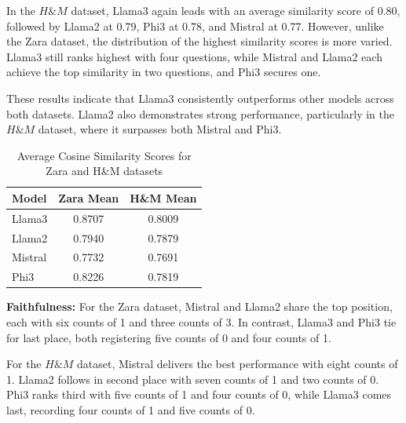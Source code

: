 \documentclass[]{article}
\begin{document}
In the $H\&M$ dataset, Llama3 again leads with an average similarity score of 0.80, followed by Llama2 at 0.79, Phi3 at 0.78, and Mistral at 0.77. However, unlike the Zara dataset, the distribution of the highest similarity scores is more varied. Llama3 still ranks highest with four questions, while Mistral and Llama2 each achieve the top similarity in two questions, and Phi3 secures one.

These results indicate that Llama3 consistently outperforms other models across both datasets. Llama2 also demonstrates strong performance, particularly in the $H\&M$ dataset, where it surpasses both Mistral and Phi3.

\begin{table}[H]
    \centering
    \begin{tabular}{lcc}
        \toprule
        \textbf{Model} & \textbf{Zara Mean} & \textbf{H\&M Mean} \\
        \midrule
        Llama3  & 0.8707 & 0.8009 \\
        Llama2  & 0.7940 & 0.7879 \\
        Mistral & 0.7732 & 0.7691 \\
        Phi3    & 0.8226 & 0.7819 \\
        \bottomrule
    \end{tabular}
    \caption{Average Cosine Similarity Scores for Zara and H\&M datasets}
    \label{tab:cosine_similarity}
\end{table}

\textbf{Faithfulness:}
For the Zara dataset, Mistral and Llama2 share the top position, each with six counts of 1 and three counts of 3. In contrast, Llama3 and Phi3 tie for last place, both registering five counts of 0 and four counts of 1.  

For the $H\&M$ dataset, Mistral delivers the best performance with eight counts of 1. Llama2 follows in second place with seven counts of 1 and two counts of 0. Phi3 ranks third with five counts of 1 and four counts of 0, while Llama3 comes last, recording four counts of 1 and five counts of 0.
\end{document}
